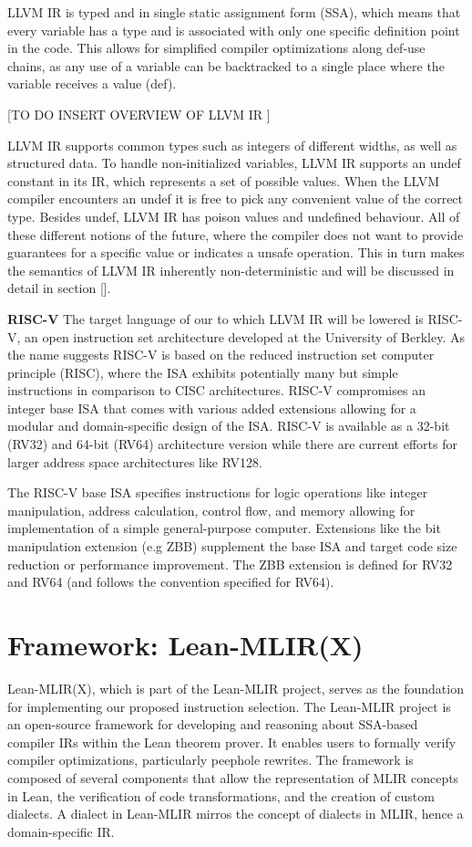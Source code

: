 LLVM IR is typed and in single static assignment form (SSA), which means that every variable has a type and is associated with only one specific definition point in the code. This allows for simplified compiler optimizations along def-use chains, as any use of a variable can be backtracked to a single place where the variable receives a value (def). 

[TO DO INSERT OVERVIEW OF LLVM IR ]

LLVM IR supports common types such as integers of different widths, as well as structured data. To handle non-initialized variables, LLVM IR supports an undef constant in its IR, which represents a set of possible values. When the LLVM compiler encounters an undef it is free to pick any convenient value of the correct type. Besides undef, LLVM IR  has poison values and undefined behaviour. All of these different notions of the future, where the compiler does not want to provide guarantees for a specific value or indicates a unsafe operation. This in turn makes the semantics of LLVM IR inherently non-deterministic and will be discussed in detail in section []. 

\textbf{RISC-V}
The target language of our to which LLVM IR will be lowered  is RISC-V, an open instruction set architecture developed at the University of Berkley. As the name suggests RISC-V is based on the reduced instruction set computer principle (RISC), where the ISA exhibits potentially many but simple instructions in comparison to CISC architectures.  RISC-V compromises an integer base ISA that comes with various added extensions allowing for a modular and domain-specific design of the ISA. RISC-V is available as a 32-bit (RV32) and 64-bit (RV64) architecture version while there are current efforts for  larger address space architectures like  RV128. 

The RISC-V base ISA specifies instructions for logic operations like integer manipulation, address calculation, control flow, and memory allowing for implementation of a simple general-purpose computer. Extensions like the bit manipulation extension (e.g ZBB)  supplement the base ISA and target code size reduction or performance improvement. The ZBB extension is defined for RV32 and RV64 (and follows the convention specified for RV64).
\section {Framework: Lean-MLIR(X)}
Lean-MLIR(X), which is part of the Lean-MLIR project, serves as the foundation for implementing our proposed instruction selection.
The Lean-MLIR project is an open-source framework for developing and reasoning about SSA-based compiler IRs within the Lean theorem prover. It enables users to formally verify compiler optimizations, particularly peephole rewrites. The framework is composed of several components that allow the representation of MLIR concepts in Lean, the verification of code transformations, and the creation of custom dialects. A dialect in Lean-MLIR mirros the concept of dialects in MLIR, hence a domain-specific IR.

